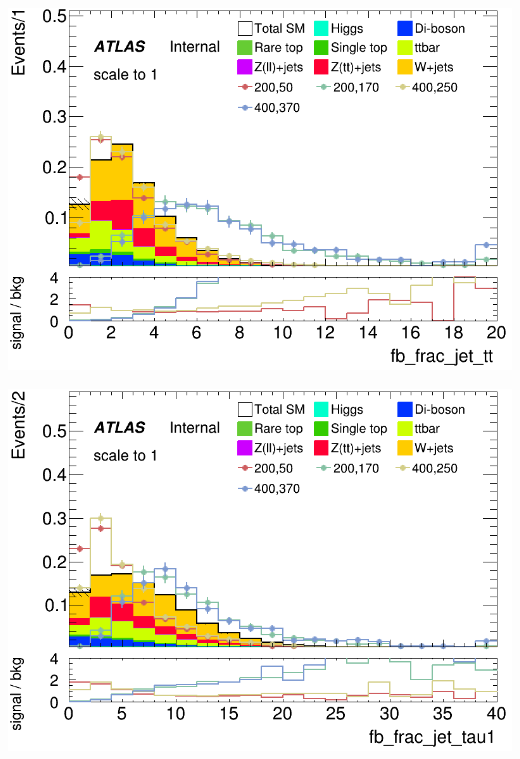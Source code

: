 \documentclass[usenames,dvipsnames]{beamer}
\begin{document}
\begin{frame}
    \begin{minipage}{0.32\textwidth}
        \centering
        \includegraphics[width=\textwidth]{graphics/LH_met_sig/LH_fb_frac_jet_tt_norm.png}
    \end{minipage}
    \hfill
    \begin{minipage}{0.32\textwidth}
        \centering
        \includegraphics[width=\textwidth]{graphics/LH_met_sig/LH_fb_frac_jet_tau1_norm.png}
    \end{minipage}
    \hfill
    \begin{minipage}{0.32\textwidth}
        \centering

\end{minipage}
\end{frame}
\end{document}
